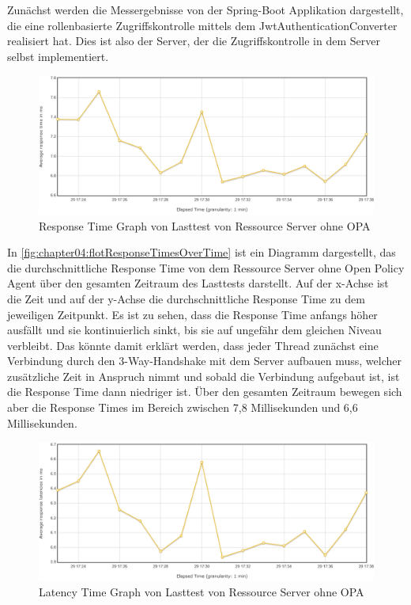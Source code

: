 Zunächst werden die Messergebnisse von der Spring-Boot Applikation dargestellt, die eine rollenbasierte Zugriffskontrolle mittels dem JwtAuthenticationConverter realisiert hat. Dies ist also der Server, der die Zugriffskontrolle in dem Server selbst implementiert. 

\begin{figure}[htbp]
  \centering
  \includegraphics[width=1.0\textwidth]{gfx/flotResponseTimesOverTime.png}
  \caption{Response Time Graph von Lasttest von Ressource Server ohne OPA}
  \label{fig:chapter04:flotResponseTimesOverTime}
\end{figure}

In \autoref{fig:chapter04:flotResponseTimesOverTime} ist ein Diagramm dargestellt, das die durchschnittliche Response Time von dem Ressource Server ohne Open Policy Agent über den gesamten Zeitraum des Lasttests darstellt. Auf der x-Achse ist die Zeit und auf der y-Achse die durchschnittliche Response Time zu dem jeweiligen Zeitpunkt. Es ist zu sehen, dass die Response Time anfangs höher ausfällt und sie kontinuierlich sinkt, bis sie auf ungefähr dem gleichen Niveau verbleibt. Das könnte damit erklärt werden, dass jeder Thread zunächst eine Verbindung durch den 3-Way-Handshake mit dem Server aufbauen muss, welcher zusätzliche Zeit in Anspruch nimmt und sobald die Verbindung aufgebaut ist, ist die Response Time dann niedriger ist. Über den gesamten Zeitraum bewegen sich aber die Response Times im Bereich zwischen 7,8 Millisekunden und 6,6 Millisekunden. 

\begin{figure}[htbp]
  \centering
  \includegraphics[width=1.0\textwidth]{gfx/flotLatenciesOverTime.png}
  \caption{Latency Time Graph von Lasttest von Ressource Server ohne OPA}
  \label{fig:chapter04:flotLatenciesOverTime}
\end{figure}

